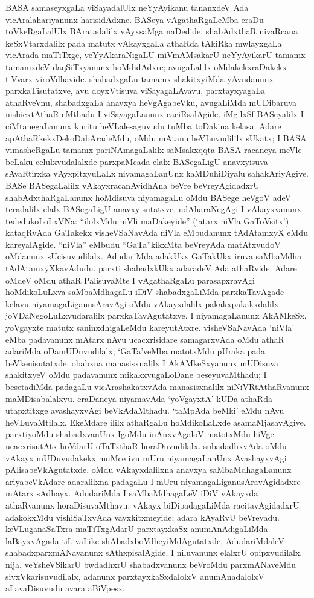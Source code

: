 BASA samaseyxgaLa viSayadalUlx neYyAyikanu tananxdeV Ada vicAralahariyanunx harisidAdxne. BASeya vAgathaRgaLeMba eraDu toVkeRgaLalUlx BAratadalilx vAyxsaMga naDedide. shabAdxthaR nivaRcana keSxVtarxdalilx pada matutx vAkayxgaLa athaRda tAkiRka mwlayxgaLa vicArada maTiTxge, veYyAkaraNigaLU miVmAMsakarU neYyAyikarU tamamx tamamxdeV daqSiTxyanunx hoMdidAdxre; avugaLalilx oMdakekxraDakekx tiVvarx viroVdhavide. shabadxgaLu tamamx shakitxyiMda yAvudanunx parxkaTisutatxve, avu doyxVtisuva viSayagaLAvavu, parxtayxya\-gaLa athaRveVnu, shabadxgaLa anavxya heVgAgabeVku, avugaLiMda mUDibaruva nishicx\-tAthaR eMthadu I viSayagaLanunx caciRsalAgide. iMgilxSf BASeyalilx I ciMtane\-gaLanunx kuritu heVLalesaguvudu tuMba toDakina kelasa. Adare apAthaRkekxDekoDabAradeMdu, oMdu mAtanu heVLuvudililx sUkatx; I BASA vimasheRgaLu tamamx pariNAmagaLalilx saMsakxqqta BASA racaneya meVle beLaku celulxvudalalxde parxpaMcada elalx BASegaLigU anavxyisuva sAvaRtirxka vAyxpitxyuLaLx niyamagaLanUnx kaMDuhiDiyalu sahakAri\-yAgive. BASe BASegaLalilx vAkayxracanAvidhAna beVre beVreyAgidadxrU shabAdxthaRgaLanunx hoMdi\-suva niyamagaLu oMdu BASege heVgoV adeV teradalilx elalx BASegaLigU anavxyi\-sutatxve. udAharaNegAgi I vAkayxvanunx tededukoLoLxVNa: ``ilolxMdu niVli maDake\-yide'' (`atarx niVla GaToVsitx') kataqRvAda GaTakekx visheVSaNavAda niVla eMbu\-danunx tAdAtamxyX eMdu kareyalAgide. ``niVla'' eMbudu ``GaTa''kikxMta beVreyAda matAtx\-vudoV oMdanunx sUcisuvudilalx. AdudariMda adakUkx GaTakUkx iruva saMbaMdha tAdAtamxyXkavAdudu. parxti shabadxkUkx adaradeV Ada athaRvide. Adare oMdeV oMdu athaR PalisuvaMte I vAgathaRgaLu parasapxravAgi hoMdikoLuLxva saMbaMdhagaLu iDiV shabadxgaLiMda parxkaTavAgade kelavu niyamagaLiganusAravAgi oMdu vAkayxdalilx pakakxpakakx\-dalilx joVDaNegoLuLxvudaralilx parxkaTavAgutatxve. I niyamagaLanunx AkAMkeSx, yoVgayxte matutx saninxdhigaLeMdu kareyutAtxre. visheVSaNavAda `niVla' eMba padavanunx mAtarx nAvu ucacxrisidare samagarxvAda oMdu athaR adariMda oDamUDuvudilalx; `GaTa'veMba \hbox{matotxMdu} pUraka pada beVkenisutatxde. obabxna manasisxnalilx I AkAMkeSxyanunx mUDi\-suva shakitxyeV oMdu padavanunx mikakxvugaLoDane beseyuvaMthadu; I besetadiMda padagaLu vicArashakatxvAda manasisxnalilx niNiVRtAthaRvanunx maMDisabalalxvu. eraDaneya niyamavAda `yoVgayxtA' kUDa athaRda utapxtitxge avashayxvAgi beVkAdaMthadu. `taMpAda beMki' eMdu nAvu heVLuvaMtilalx. EkeMdare ililx athaRgaLu hoMdikoLaLxde asamaMjasavAgive. parxtiyoMdu shabadxvanUnx IgoMdu inAnxvAgaloV matotxMdu hiVge ucacxrisutAtx hoVdarU oTaTxthaR horaDuvudilalx. subadadhxvAda oMdu vAkayx mUDuvudakekx muMce ivu mUru niyamagaLanUnx AvashayxvAgi pAlisabeVkAgutatxde. oMdu vAkayxdalilxna anavxya saMbaMdhagaLanunx ariyabeVkAdare adaralilxna padagaLu I mUru niyamagaLiganusAravAgidadxre mAtarx sAdhayx. AdudariMda I saMbaMdhagaLeV iDiV vAkayxda athaRvanunx horaDisuvaMthavu. vAkayx biDipadagaLiMda racitavAgidadxrU adakokxMdu vishiSaTxvAda vayxkitxmeyide; adara kAyaRvU beVreyadu. keVLuganaSaTxra maTiTxgAdarU parxtayxkaSx anumAnAdigaLiMda laBayxvAgada tiLivaLike shAbadxboVdheyiMdA\-gutatxde, AdudariMdaleV shabadxparxmANavanunx sAthxpisalAgide. I niluvanunx elalxrU opipx\-vudilalx, nija. veYsheVSikarU bwdadhxrU shabadxvanunx beVroMdu parxmANaveMdu sivxVkarisu\-vudilalx, adanunx parxtayxkaSxdalolxV anumAnadalolxV aLavaDisuvudu avara aBiVpesx. 